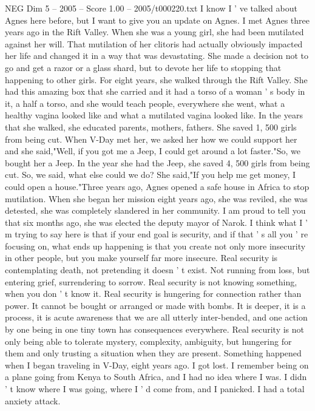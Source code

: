 \begin{textsample}{NEG Dim 5 – 2005 – Score 1.00 – 2005/t000220.txt}
I know I ' ve talked about Agnes here before, but I want to give you an update on Agnes.
I met Agnes three years ago in the Rift Valley.
When she was a young girl, she had been mutilated against her will.
That mutilation of her clitoris had actually obviously impacted her life and changed it in a way that was devastating.
She made a decision not to go and get a razor or a glass shard, but to devote her life to stopping that happening to other girls.
For eight years, she walked through the Rift Valley.
She had this amazing box that she carried and it had a torso of a woman ' s body in it, a half a torso, and she would teach people, everywhere she went, what a healthy vagina looked like and what a mutilated vagina looked like.
In the years that she walked, she educated parents, mothers, fathers.
She saved 1, 500 girls from being cut.
When V-Day met her, we asked her how we could support her and she said,"Well, if you got me a Jeep, I could get around a lot faster."So, we bought her a Jeep.
In the year she had the Jeep, she saved 4, 500 girls from being cut.
So, we said, what else could we do?
She said,"If you help me get money, I could open a house."Three years ago, Agnes opened a safe house in Africa to stop mutilation.
When she began her mission eight years ago, she was reviled, she was detested, she was completely slandered in her community.
I am proud to tell you that six months ago, she was elected the deputy mayor of Narok.
I think what I ' m trying to say here is that if your end goal is security, and if that ' s all you ' re focusing on, what ends up happening is that you create not only more insecurity in other people, but you make yourself far more insecure.
Real security is contemplating death, not pretending it doesn ' t exist.
Not running from loss, but entering grief, surrendering to sorrow.
Real security is not knowing something, when you don ' t know it.
Real security is hungering for connection rather than power.
It cannot be bought or arranged or made with bombs.
It is deeper, it is a process, it is acute awareness that we are all utterly inter-bended, and one action by one being in one tiny town has consequences everywhere.
Real security is not only being able to tolerate mystery, complexity, ambiguity, but hungering for them and only trusting a situation when they are present.
Something happened when I began traveling in V-Day, eight years ago.
I got lost.
I remember being on a plane going from Kenya to South Africa, and I had no idea where I was.
I didn ' t know where I was going, where I ' d come from, and I panicked.
I had a total anxiety attack.

\end{textsample}
